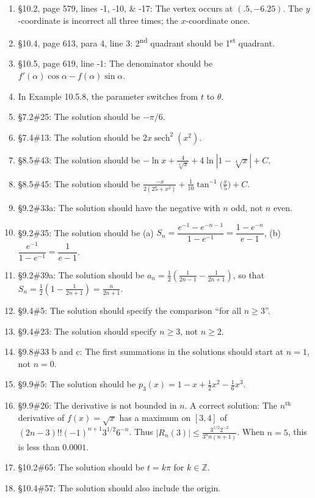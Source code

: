 \documentclass{amsart}
\newcommand{\ds}{\displaystyle}
\newcommand{\abs}[1]{\left\lvert#1\right\rvert}
\DeclareMathOperator{\sech}{sech}
\begin{document}
\begin{enumerate}
\item \S10.2, page 579, lines -1, -10, \& -17: The vertex occurs at $(.5,-6.25)$.  The $y$-coordinate is incorrect all three times; the $x$-coordinate once.
\item \S10.4, page 613, para 4, line 3: 2\textsuperscript{nd} quadrant should be 1\textsuperscript{st} quadrant.
\item \S10.5, page 619, line -1: The denominator should be $f'(\alpha)\cos\alpha-f(\alpha)\sin\alpha$.
\item In Example 10.5.8, the parameter switches from $t$ to $\theta$.
\item \S7.2\#25: The solution should be $-\pi/6$.
\item \S7.4\#13: The solution should be $2x\sech^2(x^2)$.
\item \S8.5\#43: The solution should be $\ds-\ln x+\frac4{\sqrt[4]{x}}+4\ln\abs{1-\sqrt[4]{x}}+C$.
\item \S8.5\#45: The solution should be $\ds\frac{-x}{2(25+x^2)}+\frac1{10}\tan^{-1}\bigl(\frac x5\bigr)+C$.
\item \S9.2\#33a: The solution should have the negative with $n$ odd, not $n$ even.
\item \S9.2\#35: The solution should be (a) $S_n=\dfrac{e^{-1}-e^{-n-1}}{1-e^{-1}}=\dfrac{1-e^{-n}}{e-1}$, (b) $\dfrac{e^{-1}}{1-e^{-1}}=\dfrac1{e-1}$.
\item \S9.2\#39a: The solution should be $a_n = \frac12\left(\frac{1}{2n-1}-\frac{1}{2n+1}\right)$, so that $S_n=\frac12\left(1-\frac1{2n+1}\right) = \frac{n}{2n+1}$.
\item \S9.4\#5: The solution should specify the comparison ``for all $n\ge 3$''.
\item \S9.4\#23: The solution should specify $n\ge3$, not $n\ge2$.
\item \S9.8\#33 b and c: The first summations in the solutions should start at $n=1$, not $n=0$.
\item \S9.9\#5: The solution should be $p_3(x)=1-x+\frac12 x^2-\frac16 x^3$.
\item \S9.9\#26: The derivative is not bounded in $n$.  A correct solution: The $n^\text{th}$ derivative of $f(x)=\sqrt x$ has a maximum on $[3,4]$ of $(2n-3)!!(-1)^{n+1}3^{1/2}6^{-n}$.  Thus $\abs{R_n(3)}\leq \frac{3^{1/2}2^{-2}}{3^n n(n+1)}$. When $n=5$, this is less than $0.0001$.
\item \S10.2\#65: The solution should be $t=k\pi$ for $k\in\mathbb{Z}$.
\item \S10.4\#57: The solution should also include the origin.
\label{2018-07-13IIplus}
\end{enumerate}\bigskip
\end{document}
